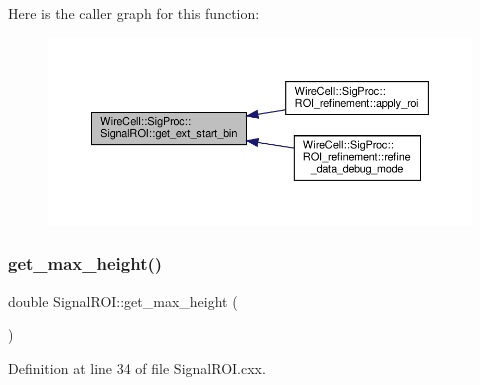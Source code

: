Here is the caller graph for this function\+:
\nopagebreak
\begin{figure}[H]
\begin{center}
\leavevmode
\includegraphics[width=350pt]{class_wire_cell_1_1_sig_proc_1_1_signal_r_o_i_ab7e97b198f41b189dc24556c6c0ccd52_icgraph}
\end{center}
\end{figure}
\mbox{\label{class_wire_cell_1_1_sig_proc_1_1_signal_r_o_i_a32fab4e24000404a740a19813892e105}} 
\subsubsection{\texorpdfstring{get\+\_\+max\+\_\+height()}{get\_max\_height()}}
{\footnotesize\ttfamily double Signal\+R\+O\+I\+::get\+\_\+max\+\_\+height (\begin{DoxyParamCaption}{ }\end{DoxyParamCaption})}



Definition at line 34 of file Signal\+R\+O\+I.\+cxx.

